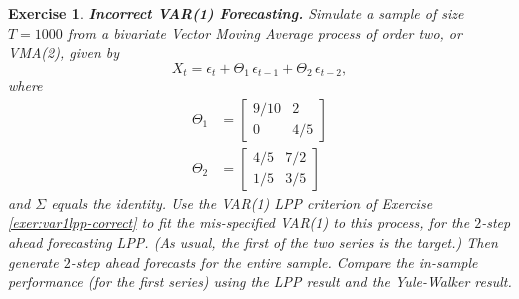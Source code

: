 \documentclass[a4paper]{book}
\newtheorem{Exercise}{Exercise}
\begin{document}
\begin{Exercise} {\bf Incorrect VAR(1) Forecasting.} \rm
\label{exer:var1lpp-incorrect.fore}
 Simulate a sample of size $T=1000$ from
 a bivariate Vector Moving Average process of order two, or VMA(2), given by
\[
  X_t = \epsilon_t + \Theta_1 \, \epsilon_{t-1} + \Theta_2 \, \epsilon_{t-2},
\]
  where
\begin{align*}
 \Theta_1 & = \left[ \begin{array}{cc} 9/10 & 2 \\ 0 & 4/5 \end{array} \right] \\
 \Theta_2 & = \left[ \begin{array}{cc} 4/5 & 7/2 \\ 1/5 & 3/5 \end{array} \right] 
\end{align*}
  and $\Sigma$ equals the identity.  Use the VAR(1) LPP criterion of   
 Exercise \ref{exer:var1lpp-correct}  to 
 fit the mis-specified VAR(1) to this process, for   the $2$-step ahead forecasting
 LPP.  (As usual, the first of the two series is the target.)
 Then generate $2$-step ahead forecasts for the entire sample.  Compare the in-sample 
 performance  (for the first series) using the LPP result and the Yule-Walker result.
\end{Exercise}
\end{document}
